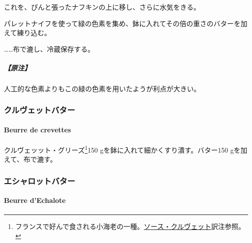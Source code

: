 \begin{recette}
これを、ぴんと張ったナフキンの上に移し、さらに水気をきる。

パレットナイフを使って緑の色素を集め、鉢に入れてその倍の重さのバターを加えて練り込む。

\ldots{}\ldots{}布で漉し、冷蔵保存する。

\hypertarget{ux539fux6ce8-1}{%
\subparagraph{【原注】}\label{ux539fux6ce8-1}}

人工的な色素よりもこの緑の色素を用いたようが利点が大きい。

\maeaki

\hypertarget{ux30afux30ebux30f4ux30a7ux30c3ux30c8ux30d0ux30bfux30fc}{%
\subsubsection{クルヴェットバター}\label{ux30afux30ebux30f4ux30a7ux30c3ux30c8ux30d0ux30bfux30fc}}

\hypertarget{beurre-de-crevettes}{%
\paragraph{Beurre de crevettes}\label{beurre-de-crevettes}}


クルヴェッット・グリーズ\footnote{フランスで好んで食される小海老の一種。\protect\hyperlink{sauce-aux-crevettes}{ソース・クルヴェット}訳注参照。}150
gを鉢に入れて細かくすり潰す。バター150 gを加えて、布で漉す。

\maeaki

\hypertarget{ux30a8ux30b7ux30e3ux30edux30c3ux30c8ux30d0ux30bfux30fc}{%
\subsubsection{エシャロットバター}\label{ux30a8ux30b7ux30e3ux30edux30c3ux30c8ux30d0ux30bfux30fc}}

\hypertarget{beurre-d-echalote}{%
\paragraph{Beurre d'Echalote}\label{beurre-d-echalote}}



\end{recette}
